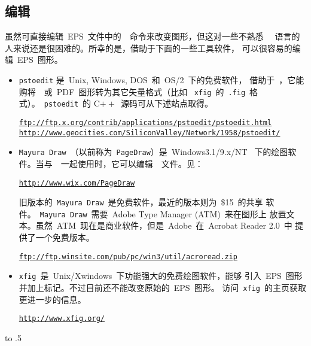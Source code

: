 \subsection[编辑\PS]{编辑~~\PS}\label{ssec:editps}

虽然可直接编辑~EPS~文件中的~\PS~命令来改变图形，但这对一些不熟悉
~\PS~语言的人来说还是很困难的。所幸的是，借助于下面的一些工具软件，
可以很容易的编辑~EPS~图形。

\begin{itemize}
	\item \texttt{pstoedit} 是~Unix, Windows, DOS~和~OS/2~下的免费软件，
	借助于~\GS，它能购将~\PS~或~PDF~图形转为其它矢量格式（比如~
	\texttt{xfig}~的~\texttt{.fig}~格式）。~\texttt{pstoedit}~的
	C$++$~源码可从下述站点取得。
	
	\href{ftp://ftp.x.org/contrib/applications/pstoedit/pstoedit.html}%
	{\texttt{ftp://ftp.x.org/contrib/applications/pstoedit/pstoedit.html}}\\
	\href{http://www.geocities.com/SiliconValley/Network/1958/pstoedit/}%
	{\texttt{http://www.geocities.com/SiliconValley/Network/1958/pstoedit/}}
	
	\item \texttt{Mayura Draw}~（以前称为~\texttt{PageDraw}）是~Windows3.1/9.x/NT~
	下的绘图软件。当与~\GS~一起使用时，它可以编辑~\PS~文件。见：
	
	\href{http://www.wix.com/PageDraw}{\texttt{http://www.wix.com/PageDraw}}
	
	旧版本的~\texttt{Mayura Draw}~是免费软件，最近的版本则为~\$15~的共享
	软件。~\texttt{Mayura Draw}~需要~Adobe Type Manager (ATM)~来在图形上
	放置文本。虽然~ATM~现在是商业软件，但是~Adobe~在~Acrobat Reader 2.0~中
	提供了一个免费版本。
	
	\href{ftp://ftp.winsite.com/pub/pc/win3/util/acroread.zip}%
	{\texttt{ftp://ftp.winsite.com/pub/pc/win3/util/acroread.zip}}
	
	\item \texttt{xfig}~是~Unix/Xwindows~下功能强大的免费绘图软件，能够
	引入~EPS~图形并加上标记。不过目前还不能改变原始的~EPS~图形。
	访问~\texttt{xfig}~的主页获取更进一步的信息。
	
	\href{http://www.xfig.org/}{\texttt{http://www.xfig.org/}}
	
\end{itemize}

\clearpage
\vbox to .5\textheight{\mbox{}}
\clearpage

\endinput
